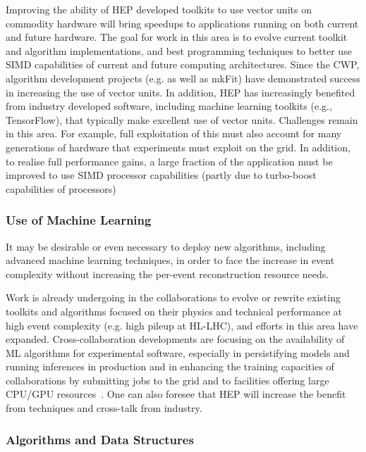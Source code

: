 Improving the ability of HEP developed toolkits to use vector units on
commodity hardware will bring speedups to applications running on both
current and future hardware. The goal for work in this area is to evolve
current toolkit and algorithm implementations, and best programming
techniques to better use SIMD capabilities of current and future
computing architectures. Since the CWP, algorithm development projects
(e.g. \cite{LHCB-FIGURE-2019-002}
as well as mkFit) have demonstrated success in increasing the use of vector
units. In addition, HEP has increasingly benefited from industry
developed software, including machine learning toolkits (e.g.,
TensorFlow), that typically make excellent use of vector units.
Challenges remain in this area. For example, full exploitation of this
must also account for many generations of hardware that experiments must
exploit on the grid. In addition, to realise full performance gains, a
large fraction of the application must be improved to use SIMD processor
capabilities (partly due to turbo-boost capabilities of processors)

\hypertarget{use-of-machine-learning-for-software-trigger-and-reconstruction-algorithms}{%
\subsubsection{Use of Machine Learning}\label{use-of-machine-learning-for-software-trigger-and-reconstruction-algorithms}}

It may be desirable or even necessary to deploy new algorithms,
including advanced machine learning techniques, in order to face the
increase in event complexity without increasing the per-event
reconstruction resource needs.

Work is already undergoing in the collaborations to evolve or rewrite
existing toolkits and algorithms focused on their physics and technical
performance at high event complexity (e.g. high pileup at HL-LHC), and
efforts in this area have expanded. Cross-collaboration developments are
focusing on the availability of ML algorithms for experimental software,
especially in persistifying models and running inferences in production
and in enhancing the
training capacities of collaborations by submitting jobs to the grid and
to facilities offering large CPU/GPU resources~\cite{LWTNN, ONNX}. One can also foresee
that HEP will increase the benefit from techniques and cross-talk from
industry.

\hypertarget{algorithms-and-data-structures}{%
\subsubsection{Algorithms and Data Structures}\label{algorithms-and-data-structures}}

